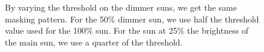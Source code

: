 \documentclass[10pt]{article}
\begin{document}
\begin{figure}[!ht]
    \centering
        \caption{By varying the threshold on the dimmer suns, we get the same masking pattern. For the 50\% dimmer sun, we use half the threshold value used for the 100\% sun. For the sun at 25\% the brightness of the main sun, we use a quarter of the threshold.}
\end{figure}
\end{document}
